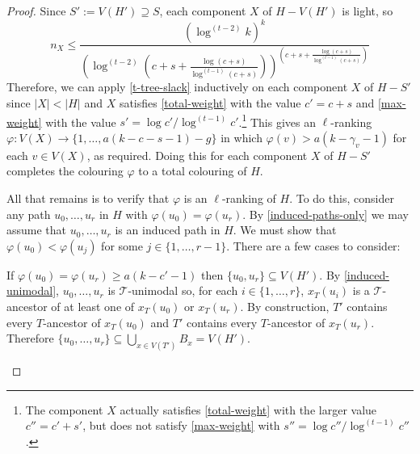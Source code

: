 \documentclass[kpfonts]{patmorin}
\theoremstyle{named}
\begin{document}
\begin{proof}
    Since $S':=V(H')\supseteq S$, each component $X$ of $H-V(H')$ is light, so
    \[
       n_{X} \le \frac{(\log^{(t-2)} k)^k}{
        \left(
            \log^{(t-2)}
                \left(
                   c+s+\tfrac{\log(c+s)}{\log^{(t-1)}(c+s)}
               \right)
        \right)^{\left(
           c+s+\tfrac{\log(c+s)}{\log^{(t-1)}(c+s)}
       \right)}
       }
   \]
   Therefore, we can apply \cref{t-tree-slack} inductively on each component $X$ of $H-S'$ since $|X|<|H|$ and $X$ satisfies \cref{total-weight} with the value $c'=c+s$ and \cref{max-weight} with the value $s'=\log c'/\log^{(t-1)} c'$.\footnote{The component $X$ actually satisfies \cref{total-weight} with the larger value $c''=c'+s'$, but does not satisfy \cref{max-weight} with $s''=\log c''/\log^{(t-1)} c''$.}  This gives an $\ell$-ranking $\varphi:V(X)\to\{1,\ldots,a(k-c-s-1)-g\}$ in which $\varphi(v)> a(k-\gamma_v-1)$ for each $v\in V(X)$, as required.
   Doing this for each component $X$ of $H-S'$ completes the colouring $\varphi$ to a total colouring of $H$.


   All that remains is to verify that $\varphi$ is an $\ell$-ranking of $H$. To do this, consider any path $u_0,\ldots,u_r$ in $H$ with $\varphi(u_0)=\varphi(u_r)$.  By \cref{induced-paths-only} we may assume that $u_0,\ldots,u_r$ is an induced path in $H$.  We must show that $\varphi(u_0)<\varphi(u_j)$ for some $j\in\{1,\ldots,r-1\}$. There are a few cases to consider:
   \begin{compactenum}
        \item If $\varphi(u_0)=\varphi(u_r) \ge a(k-c'-1)$ then $\{u_0,u_r\}\subseteq V(H')$.  By \cref{induced-unimodal}, $u_0,\ldots,u_r$ is $\mathcal{T}$-unimodal so, for each $i\in\{1,\ldots,r\}$, $x_T(u_i)$ is a $\mathcal{T}$-ancestor of at least one of $x_T(u_0)$ or $x_T(u_r)$.  By construction, $T'$ contains every $T$-ancestor of $x_T(u_0)$ and $T'$ contains every $T$-ancestor of $x_T(u_r)$.  Therefore $\{u_0,\ldots,u_r\}\subseteq \bigcup_{x\in V(T')} B_x=V(H')$.


\end{compactenum}
\end{proof}
\end{document}
